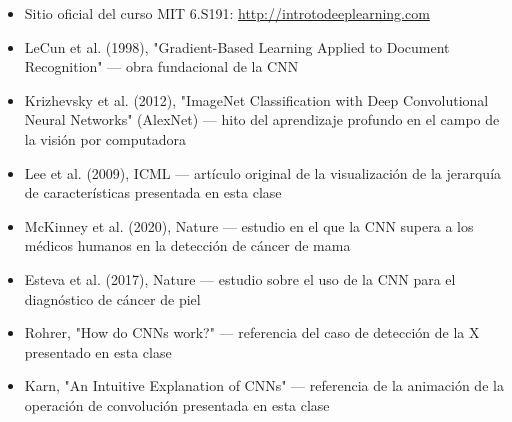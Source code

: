 \begin{itemize}
    \item Sitio oficial del curso MIT 6.S191: \url{http://introtodeeplearning.com}
    \item LeCun et al. (1998), "Gradient-Based Learning Applied to Document Recognition" — obra fundacional de la CNN
    \item Krizhevsky et al. (2012), "ImageNet Classification with Deep Convolutional Neural Networks" (AlexNet) — hito del aprendizaje profundo en el campo de la visión por computadora
    \item Lee et al. (2009), ICML — artículo original de la visualización de la jerarquía de características presentada en esta clase
    \item McKinney et al. (2020), Nature — estudio en el que la CNN supera a los médicos humanos en la detección de cáncer de mama
    \item Esteva et al. (2017), Nature — estudio sobre el uso de la CNN para el diagnóstico de cáncer de piel
    \item Rohrer, "How do CNNs work?" — referencia del caso de detección de la X presentado en esta clase
    \item Karn, "An Intuitive Explanation of CNNs" — referencia de la animación de la operación de convolución presentada en esta clase
\end{itemize}



